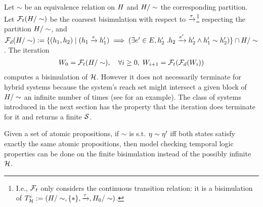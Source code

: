 Let $\sim$ be an equivalence relation on $H$ and $H/\sim$ the corresponding partition.
Let $\mathcal{F}_t(H/\sim)$ be the coarsest bisimulation with respect to $\xrightarrow{\tau}$\footnote{I.e., $\mathcal{F}_t$ only considers the continuous transition relation: it is a bisimulation of $T_{\mathcal{H}}^c := (H/\sim,\{*\},\xrightarrow{\tau},H_0/\sim)$.} 
respecting the partition $H/\sim$, 
and 
$\mathcal{F}_d(H/\sim) := \{(h_1,h_2)  \;|\; (h_1 \xrightarrow{e} h_1') \implies (\exists e' \in E, h_2' \; . h_2 \xrightarrow{e'} h_2' \land h_1' \sim h_2') \} \cap H/\sim$ \cite{VladimerouPVD08_STORMED}.
The iteration 
\begin{eqnarray}
\label{eq:Ft,Fd}
W_0 = \mathcal{F}_t(H/\sim), \quad\forall i\geq 0,\; W_{i+1} = \mathcal{F}_t(\mathcal{F}_d(W_i))
\end{eqnarray}
computes a bisimulation of $\mathcal{H}$.
However it does not necessarily terminate for hybrid systems because the system's reach set might intersect a given block of $H/\sim$ an infinite number of times (see \cite{LaFerrierePS00_Ominimal} for an example).
The class of systems introduced in the next section has the property that the iteration does terminate for it and returns a finite $\mathcal{S}$.

Given a set of atomic propositions, if $\sim$ is s.t. $\eta \sim \eta'$ iff both states satisfy exactly the same atomic propositions, then model checking temporal logic properties can be done on the finite bisimulation instead of the possibly infinite $\mathcal{H}$.